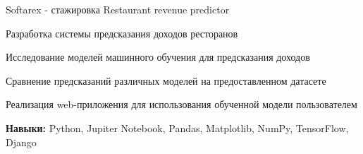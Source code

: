 \begin{cventries}
  \cventry
    {Softarex - стажировка} %
    {Restaurant revenue predictor} %
    {} %
    {} %
    {
      \begin{cvitems} %
        \item {Разработка системы предсказания доходов ресторанов}
        \item {Исследование моделей машинного обучения для предсказания доходов}
        \item {Сравнение предсказаний различных моделей на предоставленном датасете}
        \item {Реализация web-приложения для использования обученной модели пользователем}
        \item {\textbf{Навыки:} Python, Jupiter Notebook, Pandas, Matplotlib, NumPy, TensorFlow, Django}
      \end{cvitems}
    }
\end{cventries}
